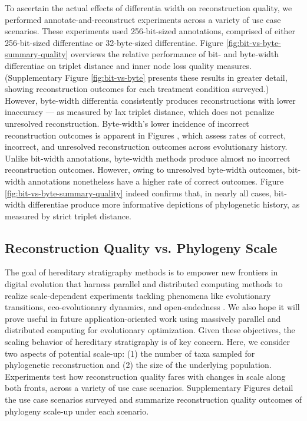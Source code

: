 To ascertain the actual effects of differentia width on reconstruction quality, we performed annotate-and-reconstruct experiments across a variety of use case scenarios.
These experiments used 256-bit-sized annotations, comprised of either 256-bit-sized differentiae or 32-byte-sized differentiae.
Figure \ref{fig:bit-vs-byte-summary-quality} overviews the relative performance of bit- and byte-width differentiae on triplet distance and inner node loss quality measures.
(Supplementary Figure \ref{fig:bit-vs-byte} presents these results in greater detail, showing reconstruction outcomes for each treatment condition surveyed.)
However, byte-width differentia consistently produces reconstructions with lower inaccuracy --- as measured by lax triplet distance, which does not penalize unresolved reconstruction.
Byte-width's lower incidence of incorrect reconstruction outcomes is apparent in Figures , which assess rates of correct, incorrect, and unresolved reconstruction outcomes across evolutionary history.
Unlike bit-width annotations, byte-width methods produce almost no incorrect reconstruction outcomes.
However, owing to unresolved byte-width outcomes, bit-width annotations nonetheless have a higher rate of correct outcomes.
Figure \ref{fig:bit-vs-byte-summary-quality} indeed confirms that, in nearly all cases, bit-width differentiae produce more informative depictions of phylogenetic history, as measured by strict triplet distance.

\subsection{Reconstruction Quality vs. Phylogeny Scale} \label{sec:scaling}


The goal of hereditary stratigraphy methods is to empower new frontiers in digital evolution that harness parallel and distributed computing methods to realize scale-dependent experiments tackling phenomena like evolutionary transitions, eco-evolutionary dynamics, and open-endedness \citep{moreno2022exploring,dolson2021digital,channon2019maximum}.
We also hope it will prove useful in future application-oriented work using massively parallel and distributed computing for evolutionary optimization.
Given these objectives, the scaling behavior of hereditary stratigraphy is of key concern.
Here, we consider two aspects of potential scale-up: (1) the number of taxa sampled for phylogenetic reconstruction and (2) the size of the underlying population.
Experiments test how reconstruction quality fares with changes in scale along both fronts, across a variety of use case scenarios.
Supplementary Figures  detail the use case scenarios surveyed and summarize reconstruction quality outcomes of phylogeny scale-up under each scenario.

